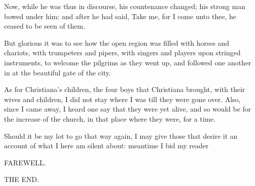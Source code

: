 Now, while he was thus in discourse, his countenance changed; his strong man bowed under him: and after he had said, Take me, for I come unto thee, he ceased to be seen of them.

But glorious it was to see how the open region was filled with horses and chariots, with trumpeters and pipers, with singers and players upon stringed instruments, to welcome the pilgrims as they went up, and followed one another in at the beautiful gate of the city.

As for Christiana's children, the four boys that Christiana brought, with their wives and children, I did not stay where I was till they were gone over. Also, since I came away, I heard one say that they were yet alive, and so would be for the increase of the church, in that place where they were, for a time.

Should it be my lot to go that way again, I may give those that desire it an account of what I here am silent about: meantime I bid my reader

FAREWELL.

THE END. 
